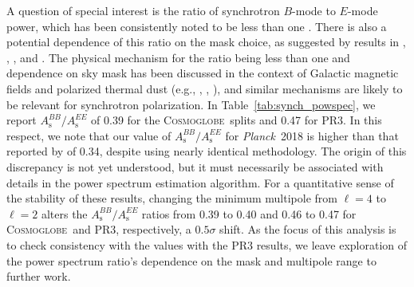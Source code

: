 \documentclass[twocolumn]{../../common/aa}
\def\Planck{\emph{Planck}}
\newcommand{\cosmoglobe}{\textsc{Cosmoglobe}}
\begin{document}
A question of special interest is the ratio of synchrotron $B$-mode to $E$-mode power, which has been consistently noted to be less than one \citep{page2007,planck2014-a12,planck2016-l04,krachmalnicoff2018,martire2022,QUIJOTE_IV,eimer2023}. There is also a potential dependence of this ratio on the mask choice, as suggested by results in \citet{krachmalnicoff2018}, \citet{martire2022}, \citet{QUIJOTE_IV}, and \citet{eimer2023}. The physical mechanism for the ratio being less than one and dependence on sky mask has been discussed in the context of Galactic magnetic fields and polarized thermal dust (e.g., \citealp{kandel2017}, \citealp{so_galsci}, \citealp{vacher2023}), and similar mechanisms are likely to be relevant for synchrotron polarization. In Table~\ref{tab:synch_powspec}, we report $A_{\mathrm{s}}^{BB}/A_{\mathrm{s}}^{EE}$ of 0.39 for the \cosmoglobe\ splits and 0.47 for PR3. In this respect, we note that our value of $A_{\mathrm{s}}^{BB}/A_{\mathrm{s}}^{EE}$ for \Planck\ 2018 is higher than that reported by \citet{planck2016-l04} of 0.34, despite using nearly identical methodology. The origin of this discrepancy is not yet understood, but it must necessarily be associated with details in  the power spectrum estimation algorithm. For a quantitative sense of the stability of these results, changing the minimum multipole from $\ell=4$ to $\ell=2$ alters the $A_\mathrm{s}^{BB}/A_\mathrm{s}^{EE}$ ratios from 0.39 to 0.40 and 0.46 to 0.47 for \cosmoglobe\ and PR3, respectively, a $0.5\sigma$ shift.
As the focus of this analysis is to check consistency with the values with the PR3 results, we leave exploration of the power spectrum ratio’s dependence on the mask and multipole range to further work.
\end{document}
